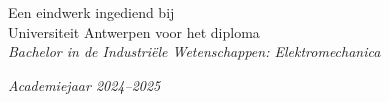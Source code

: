 \documentclass[a4paper,11pt,oneside]{book}
\begin{document}
\begin{titlepage}
\begin{center}
            \large Een eindwerk ingediend bij\\Universiteit Antwerpen voor het diploma\\
            \textit{Bachelor in de Industriële Wetenschappen: Elektromechanica}\\[0.3cm]
            \vfill
            
            \textit{Academiejaar 2024--2025 \\[0.3cm]}
        \end{center}
    \end{titlepage}
    
    
     
    
       
    
    \tableofcontents
    \listoffigures
    \listoftables



    
    
    \mainmatter
    
\end{document}
